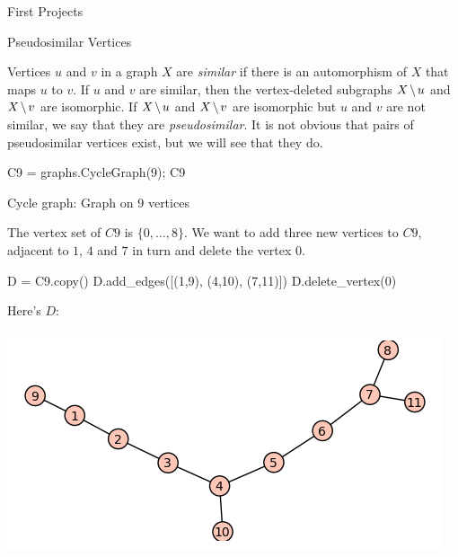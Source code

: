 \begin{chap}{First Projects}
%
\begin{sect}{Pseudosimilar Vertices}
%
\begin{para}
Vertices $u$ and $v$ in a graph $X$ are \textsl{similar} if there is an automorphism
of $X$ that maps $u$ to $v$. If $u$ and $v$ are similar, then the vertex-deleted
subgraphs $X\mathbin{\mkern-1.5mu\setminus\mkern-1.5mu} u$ and $X\mathbin{\mkern-1.5mu\setminus\mkern-1.5mu} v$ are isomorphic. If $X\mathbin{\mkern-1.5mu\setminus\mkern-1.5mu} u$ and $X\mathbin{\mkern-1.5mu\setminus\mkern-1.5mu} v$ 
are isomorphic but $u$ and $v$ are not similar, we say that they are
\textsl{pseudosimilar}. It is not obvious that pairs of pseudosimilar vertices
exist, but we will see that they do.
\end{para}
%
\begin{sagecode}
\begin{sageinput}
C9 = graphs.CycleGraph(9); C9
\end{sageinput}
\begin{sageoutput}
Cycle graph: Graph on 9 vertices
\end{sageoutput}
\end{sagecode}
%
\begin{para}
The vertex set of $C9$ is $\{0,\ldots,8\}$. We want to add three new vertices
to $C9$, adjacent to $1$, $4$ and $7$ in turn and delete the vertex $0$.
\end{para}
%
\begin{sagecode}
\begin{sageinput}
D = C9.copy()
D.add_edges([(1,9), (4,10), (7,11)])
D.delete_vertex(0)
\end{sageinput}
\end{sagecode}
%
\begin{para}
Here's $D$:
\end{para}
%
\begin{para}
\includegraphics{graphplot.png}
\end{para}
%
\begin{para}

\end{para}
\end{sect}
\end{chap}
